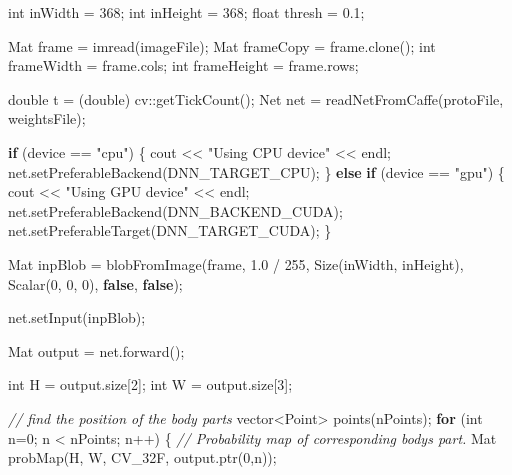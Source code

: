 \documentclass[
  12pt,
  a4paper,
]{article}
\newenvironment{Shaded}{}{}
\newcommand{\CommentTok}[1]{\textcolor[rgb]{0.38,0.63,0.69}{\textit{#1}}}
\newcommand{\ControlFlowTok}[1]{\textcolor[rgb]{0.00,0.44,0.13}{\textbf{#1}}}
\newcommand{\DataTypeTok}[1]{\textcolor[rgb]{0.56,0.13,0.00}{#1}}
\newcommand{\DecValTok}[1]{\textcolor[rgb]{0.25,0.63,0.44}{#1}}
\newcommand{\FloatTok}[1]{\textcolor[rgb]{0.25,0.63,0.44}{#1}}
\newcommand{\KeywordTok}[1]{\textcolor[rgb]{0.00,0.44,0.13}{\textbf{#1}}}
\newcommand{\NormalTok}[1]{#1}
\newcommand{\StringTok}[1]{\textcolor[rgb]{0.25,0.44,0.63}{#1}}
\begin{document}
\begin{Shaded}
\begin{Highlighting}[numbers=left,,]
    \DataTypeTok{int}\NormalTok{ inWidth = }\DecValTok{368}\NormalTok{;}
    \DataTypeTok{int}\NormalTok{ inHeight = }\DecValTok{368}\NormalTok{;}
    \DataTypeTok{float}\NormalTok{ thresh = }\FloatTok{0.1}\NormalTok{;    }

\NormalTok{    Mat frame = imread(imageFile);}
\NormalTok{    Mat frameCopy = frame.clone();}
    \DataTypeTok{int}\NormalTok{ frameWidth = frame.cols;}
    \DataTypeTok{int}\NormalTok{ frameHeight = frame.rows;}

    \DataTypeTok{double}\NormalTok{ t = (}\DataTypeTok{double}\NormalTok{) cv::getTickCount();}
\NormalTok{    Net net = readNetFromCaffe(protoFile, weightsFile);}

    \ControlFlowTok{if}\NormalTok{ (device == }\StringTok{"cpu"}\NormalTok{)}
\NormalTok{    \{}
\NormalTok{        cout \textless{}\textless{} }\StringTok{"Using CPU device"}\NormalTok{ \textless{}\textless{} endl;}
\NormalTok{        net.setPreferableBackend(DNN\_TARGET\_CPU);}
\NormalTok{    \}}
    \ControlFlowTok{else} \ControlFlowTok{if}\NormalTok{ (device == }\StringTok{"gpu"}\NormalTok{)}
\NormalTok{    \{}
\NormalTok{        cout \textless{}\textless{} }\StringTok{"Using GPU device"}\NormalTok{ \textless{}\textless{} endl;}
\NormalTok{        net.setPreferableBackend(DNN\_BACKEND\_CUDA);}
\NormalTok{        net.setPreferableTarget(DNN\_TARGET\_CUDA);}
\NormalTok{    \}}

\NormalTok{    Mat inpBlob = blobFromImage(frame, }\FloatTok{1.0}\NormalTok{ / }\DecValTok{255}\NormalTok{, Size(inWidth, inHeight), Scalar(}\DecValTok{0}\NormalTok{, }\DecValTok{0}\NormalTok{, }\DecValTok{0}\NormalTok{), }\KeywordTok{false}\NormalTok{, }\KeywordTok{false}\NormalTok{);}

\NormalTok{    net.setInput(inpBlob);}

\NormalTok{    Mat output = net.forward();}

    \DataTypeTok{int}\NormalTok{ H = output.size[}\DecValTok{2}\NormalTok{];}
    \DataTypeTok{int}\NormalTok{ W = output.size[}\DecValTok{3}\NormalTok{];}

    \CommentTok{// find the position of the body parts}
\NormalTok{    vector\textless{}Point\textgreater{} points(nPoints);}
    \ControlFlowTok{for}\NormalTok{ (}\DataTypeTok{int}\NormalTok{ n=}\DecValTok{0}\NormalTok{; n \textless{} nPoints; n++)}
\NormalTok{    \{}
        \CommentTok{// Probability map of corresponding body\textquotesingle{}s part.}
\NormalTok{        Mat probMap(H, W, CV\_32F, output.ptr(}\DecValTok{0}\NormalTok{,n));}


\end{Highlighting}
\end{Shaded}
\end{document}
